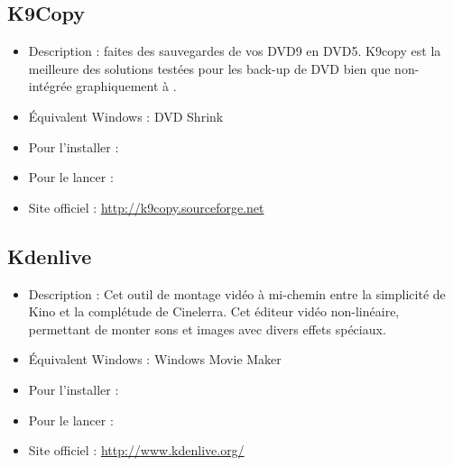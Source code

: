 \subsection{K9Copy}
\begin{itemize}
\begingroup
{}
\item Description : faites des sauvegardes de vos DVD9 en DVD5. K9copy est la meilleure des solutions testées pour les back-up de DVD bien que non-intégrée graphiquement à .{\par}
\item Équivalent Windows : DVD Shrink{\par}
\item Pour l'installer : 
\item Pour le lancer : 
\item Site officiel : \url{http://k9copy.sourceforge.net}{\par}
\endgroup
\end{itemize}
\subsection{Kdenlive}
\begin{itemize}
\begingroup
{}
\item Description : Cet outil de montage vidéo à mi-chemin entre la simplicité de Kino et la complétude de Cinelerra. Cet éditeur vidéo non-linéaire, permettant de monter sons et images avec divers effets spéciaux.{\par}
\endgroup
\item Équivalent Windows : Windows Movie Maker{\par}
\item Pour l'installer : 
\item Pour le lancer : 
\item Site officiel : \url{http://www.kdenlive.org/}{\par}
\end{itemize}
\newpage
